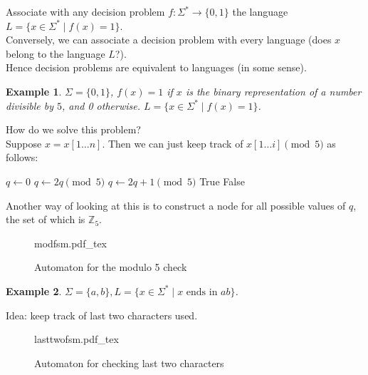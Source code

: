 \documentclass[a4paper]{article}
\newtheorem{eg}{Example}
\newcommand{\incfig}[1]{%
    \def\svgwidth{\columnwidth}
    {#1.pdf_tex}
}
\begin{document}
Associate with any decision problem $f : \Sigma^* \to \{0, 1\}$ the language $L = \{x \in \Sigma^* \mid f(x) = 1\}$.\\
Conversely, we can associate a decision problem with every language (does $x$ belong to the language $L$?).\\
Hence decision problems are equivalent to languages (in some sense).

\begin{eg}
    $\Sigma = \{0, 1\}$, $f(x) = 1$ if $x$ is the binary representation of a number divisible by $5$, and 0 otherwise. $L = \{x \in \Sigma^* \mid f(x) = 1\}$.
\end{eg}

How do we solve this problem?\\

Suppose $x = x[1 \ldots n]$. Then we can just keep track of $x[1 \ldots i] \pmod 5$ as follows:

\begin{algorithmic}
        \State $q \gets 0$
                \State $q \gets 2q \pmod 5$
            \Else
                \State $q \gets 2q + 1 \pmod 5$
            \EndIf
        \EndFor
            \State \Return True
        \Else
            \State \Return False
        \EndIf
    \EndFunction
\end{algorithmic}

Another way of looking at this is to construct a node for all possible values of $q$, the set of which is $\mathbb{Z}_5$. 

\begin{figure}[ht]
    \centering
    \incfig{modfsm}
    \caption{Automaton for the modulo 5 check}
    \label{fig:modfsm}
\end{figure}

\begin{eg}
    $\Sigma = \{a, b\}, L = \{x \in \Sigma^* \mid x \text{ ends in } ab\}$.
\end{eg}

Idea: keep track of last two characters used.

\newpage

\begin{figure}[ht]
    \centering
    \incfig{lasttwofsm}
    \caption{Automaton for checking last two characters}
    \label{fig:lasttwofsm}
\end{figure}
\end{document}
